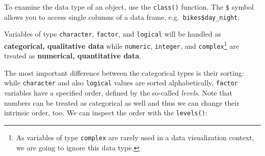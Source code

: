\documentclass[
]{krantz}
\makeatletter
\newenvironment{Shaded}{\begin{snugshade}}{\end{snugshade}}
\newcommand{\DocumentationTok}[1]{\textcolor[rgb]{0.37,0.37,0.37}{\textbf{\textit{#1}}}}
\newcommand{\FunctionTok}[1]{\textcolor[rgb]{0.27,0.27,0.27}{\textbf{#1}}}
\newcommand{\NormalTok}[1]{#1}
\newcommand{\SpecialCharTok}[1]{\textcolor[rgb]{0.43,0.43,0.43}{\textbf{#1}}}
\newenvironment{kframe}{%
\medskip{}
\setlength{\fboxsep}{.8em}
 \def\at@end@of@kframe{}%
 \ifinner\ifhmode%
  \def\at@end@of@kframe{\end{minipage}}%
  \begin{minipage}{\columnwidth}%
 \fi\fi%
 \def\FrameCommand##1{\hskip\@totalleftmargin \hskip-\fboxsep
 \colorbox{shadecolor}{##1}\hskip-\fboxsep
     \hskip-\linewidth \hskip-\@totalleftmargin \hskip\columnwidth}%
 \MakeFramed {\advance\hsize-\width
   \@totalleftmargin\z@ \linewidth\hsize
   \@setminipage}}%
 {\par\unskip\endMakeFramed%
 \at@end@of@kframe}
\renewenvironment{Shaded}{\begin{kframe}}{\end{kframe}}
\makeatother
\begin{document}
To examine the data type of an object, use the \texttt{class()} function. The \texttt{\$} symbol allows you to access single columns of a data frame, e.g.~\texttt{bikes\$day\_night}:

\begin{Shaded}
\end{Shaded}

Variables of type \texttt{character}, \texttt{factor}, and \texttt{logical} will be handled as \textbf{categorical, qualitative data} while \texttt{numeric}, \texttt{integer}, and \texttt{complex}\footnote{As variables of type \texttt{complex} are rarely used in a data visualization context, we are going to ignore this data type.} are treated as \textbf{numerical, quantitative data}.

The most important difference between the categorical types is their sorting: while \texttt{character} and also \texttt{logical} values are sorted alphabetically, \texttt{factor} variables have a specified order, defined by the so-called \emph{levels}. Note that numbers can be treated as categorical as well and thus we can change their intrinsic order, too. We can inspect the order with the \texttt{levels()}:

\begin{Shaded}
\end{Shaded}
\end{document}
